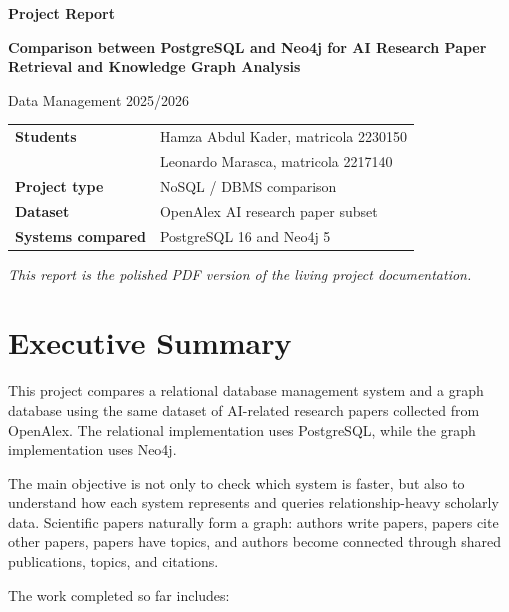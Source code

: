 \documentclass[11pt]{article}
\begin{document}
\begin{titlepage}
    \centering
    \vspace*{1.2cm}
    {\LARGE \textbf{Project Report}\par}
    \vspace{0.5cm}
    {\large \textbf{Comparison between PostgreSQL and Neo4j for AI Research Paper Retrieval and Knowledge Graph Analysis}\par}
    \vspace{0.8cm}
    Data Management 2025/2026\par
    \vspace{1.2cm}
    \begin{tabular}{ll}
        \textbf{Students} & Hamza Abdul Kader, matricola 2230150\\
                          & Leonardo Marasca, matricola 2217140\\
        \textbf{Project type} & NoSQL / DBMS comparison\\
        \textbf{Dataset} & OpenAlex AI research paper subset\\
        \textbf{Systems compared} & PostgreSQL 16 and Neo4j 5\\
    \end{tabular}
    \vfill
    \textit{This report is the polished PDF version of the living project documentation.}
\end{titlepage}

\tableofcontents
\newpage
{}

\section{Executive Summary}

This project compares a relational database management system and a graph database using the same dataset of AI-related research papers collected from OpenAlex.
The relational implementation uses PostgreSQL, while the graph implementation uses Neo4j.

The main objective is not only to check which system is faster, but also to understand how each system represents and queries relationship-heavy scholarly data.
Scientific papers naturally form a graph: authors write papers, papers cite other papers, papers have topics, and authors become connected through shared publications, topics, and citations.

The work completed so far includes:
\end{document}
